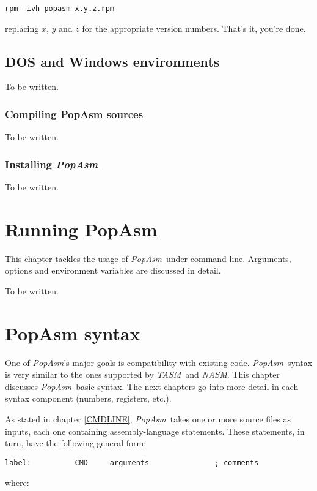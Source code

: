 \documentclass[a4paper,12pt]{book}
\newcommand{\popasm}{\emph{PopAsm}}
\newcommand{\nasm}{\emph{NASM}}
\newcommand{\tasm}{\emph{TASM}}
\begin{document}
\begin{verbatim}
rpm -ivh popasm-x.y.z.rpm
\end{verbatim}

replacing $x$, $y$ and $z$ for the appropriate version numbers. That's
it, you're done.

\section{DOS and Windows environments}
To be written.

\subsection{Compiling PopAsm sources\label{COMPDOS}}
To be written.

\subsection{Installing \popasm}
To be written.

\chapter{Running PopAsm\label{CMDLINE}}

This chapter tackles the usage of \popasm\ under command line. Arguments,
options and environment variables are discussed in detail.

To be written.

\chapter{PopAsm syntax}

One of \popasm's major goals is compatibility with existing code.
\popasm\ syntax is very similar to the ones supported by \tasm\ and
\nasm. This chapter discusses \popasm\ basic syntax. The next chapters
go into more detail in each syntax component (numbers, registers, etc.).

As stated in chapter \ref{CMDLINE}, \popasm\ takes one or more source
files as inputs, each one containing assembly-language statements. These
statements, in turn, have the following general form:

\begin{verbatim}
label:          CMD     arguments               ; comments
\end{verbatim}

where:
\end{document}
